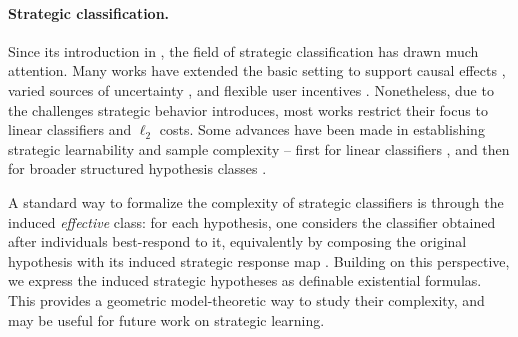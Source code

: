 \documentclass[11pt]{article}
\theoremstyle{plain}
\theoremstyle{definition}
\theoremstyle{remark}
\begin{document}
\paragraph{Strategic classification.}
Since its introduction in \citep{bruckner2012static,hardt2016strategic},
the field of strategic classification has drawn much attention.
Many works have extended the basic setting to support
causal effects \citep{miller2020strategic,shavit2020causal,horowitz2023causal},
varied sources of uncertainty \citep{ghalme2021strategic,bechavod2022information,shao2023strategic,lechner2023strategic,rosenfeld2024oneshot},
and flexible user incentives \citep{levanon2022generalized,sundaram2023pac}.
Nonetheless, due to the challenges strategic behavior introduces,
most works restrict their focus to linear classifiers and $\ell_2$ costs.
Some advances have been made in establishing strategic learnability and sample complexity -- first for linear classifiers \citep{sundaram2023pac},
and then for broader structured hypothesis classes \citep{cohen2024learnability,trachtenberg2025nonlinear}.

A standard way to formalize the complexity of strategic classifiers is through the induced \emph{effective} class: for each hypothesis, one considers the classifier obtained after individuals best-respond to it, equivalently by composing the original hypothesis with its induced strategic response map \citep[Definition 2]{zhang2021incentive}. Building on this perspective, we express the induced strategic hypotheses as definable existential formulas. This provides a geometric model-theoretic way to study their complexity, and may be useful for future work on strategic learning.



\end{document}
